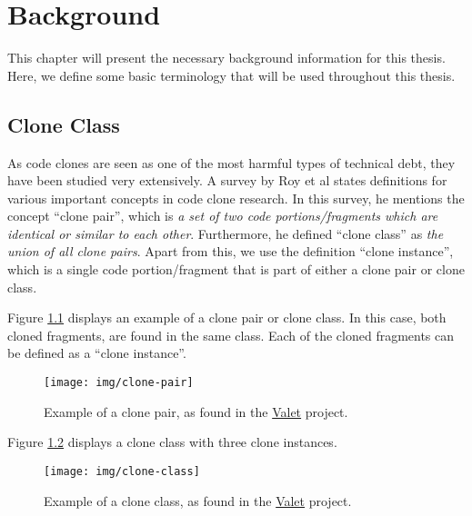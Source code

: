 \chapter{Background}
\label{ch:background}
This chapter will present the necessary background information for this thesis. Here, we define some basic terminology that will be used throughout this thesis.

\section{Clone Class}
As code clones are seen as one of the most harmful types of technical debt, they have been studied very extensively. A survey by Roy et al \cite{roy2007survey} states definitions for various important concepts in code clone research. In this survey, he mentions the concept ``clone pair'', which is \textit{a set of two code portions/fragments which are identical or similar to each other}. Furthermore, he defined ``clone class'' as \textit{the union of all clone pairs}. Apart from this, we use the definition ``clone instance'', which is a single code portion/fragment that is part of either a clone pair or clone class.

Figure \ref{fig:clonepair} displays an example of a clone pair or clone class. In this case, both cloned fragments, are found in the same class. Each of the cloned fragments can be defined as a ``clone instance''.

\begin{figure}[H]
	\texttt{[image: img/clone-pair]}
	\caption{Example of a clone pair, as found in the \href{https://github.com/Widen/valet}{Valet} project.}
	\label{fig:clonepair}
\end{figure}

Figure \ref{fig:cloneclass} displays a clone class with three clone instances.

\begin{figure}[H]
	\texttt{[image: img/clone-class]}
	\caption{Example of a clone class, as found in the \href{https://github.com/Widen/valet}{Valet} project.}
	\label{fig:cloneclass}
\end{figure}

